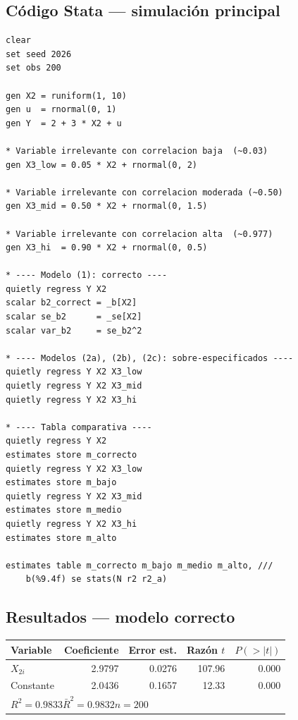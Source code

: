 \documentclass[12pt, letterpaper]{article}
\begin{document}
\subsection{Código Stata --- simulación principal}

\begin{lstlisting}[caption={Simulación: modelo correcto vs. modelos sobre-especificados}]
clear
set seed 2026
set obs 200

gen X2 = runiform(1, 10)
gen u  = rnormal(0, 1)
gen Y  = 2 + 3 * X2 + u

* Variable irrelevante con correlacion baja  (~0.03)
gen X3_low = 0.05 * X2 + rnormal(0, 2)

* Variable irrelevante con correlacion moderada (~0.50)
gen X3_mid = 0.50 * X2 + rnormal(0, 1.5)

* Variable irrelevante con correlacion alta  (~0.977)
gen X3_hi  = 0.90 * X2 + rnormal(0, 0.5)

* ---- Modelo (1): correcto ----
quietly regress Y X2
scalar b2_correct = _b[X2]
scalar se_b2      = _se[X2]
scalar var_b2     = se_b2^2

* ---- Modelos (2a), (2b), (2c): sobre-especificados ----
quietly regress Y X2 X3_low
quietly regress Y X2 X3_mid
quietly regress Y X2 X3_hi

* ---- Tabla comparativa ----
quietly regress Y X2
estimates store m_correcto
quietly regress Y X2 X3_low
estimates store m_bajo
quietly regress Y X2 X3_mid
estimates store m_medio
quietly regress Y X2 X3_hi
estimates store m_alto

estimates table m_correcto m_bajo m_medio m_alto, ///
    b(%9.4f) se stats(N r2 r2_a)
\end{lstlisting}

\subsection{Resultados --- modelo correcto}

\begin{center}
\renewcommand{\arraystretch}{1.3}
\small
\begin{tabular}{lrrrr}
\toprule
\textbf{Variable} & \textbf{Coeficiente} & \textbf{Error est.} & \textbf{Razón $t$} & \textbf{$P(>|t|)$} \\
\midrule
$X_{2i}$  & 2.9797 & 0.0276 & 107.96 & 0.000 \\
Constante & 2.0436 & 0.1657 &  12.33 & 0.000 \\
\midrule
\multicolumn{5}{l}{$R^2 = 0.9833$\quad $\bar{R}^2 = 0.9832$\quad $n = 200$} \\
\bottomrule
\end{tabular}
\end{center}
\end{document}
